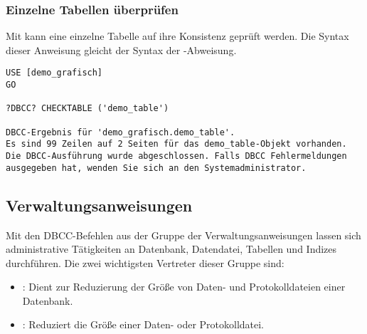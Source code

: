         \subsubsection{Einzelne Tabellen überprüfen}
          Mit  kann eine einzelne Tabelle auf
          ihre Konsistenz geprüft werden. Die Syntax dieser Anweisung gleicht
          der Syntax der -Abweisung.
\clearpage
          \begin{lstlisting}[language=ms_sql,caption={Konsistenzprüfung
          einer einzelnen Tabelle},label=admin03_31] 
USE [demo_grafisch]
GO

?DBCC? CHECKTABLE ('demo_table')

DBCC-Ergebnis für 'demo_grafisch.demo_table'.
Es sind 99 Zeilen auf 2 Seiten für das demo_table-Objekt vorhanden.
Die DBCC-Ausführung wurde abgeschlossen. Falls DBCC Fehlermeldungen 
ausgegeben hat, wenden Sie sich an den Systemadministrator.
          \end{lstlisting}         
          \begin{literaturinternet}
            \item \cite{ms176061}
            \item \cite{ms187332}
            \item \cite{ms174338}
            \item \cite{ms189496}
          \end{literaturinternet}
      \subsection{Verwaltungsanweisungen}
        Mit den DBCC-Befehlen aus der Gruppe der Verwaltungsanweisungen lassen
        sich administrative Tätigkeiten an Datenbank, Datendatei, Tabellen und
        Indizes durchführen. Die zwei wichtigsten Vertreter dieser Gruppe
        sind:
        \begin{itemize}
          \item {}: Dient zur Reduzierung der
          Größe von Daten- und Protokolldateien einer Datenbank.
          \item {}: Reduziert die Größe einer Daten-
          oder Protokolldatei.
       \end{itemize}
